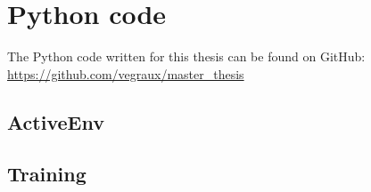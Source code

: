 \documentclass[11pt]{book}
\begin{document}
\chapter{Python code}
The Python code written for this thesis can be found on GitHub: \url{https://github.com/vegraux/master_thesis}
\section{ActiveEnv}



\section{Training}

\end{document}
